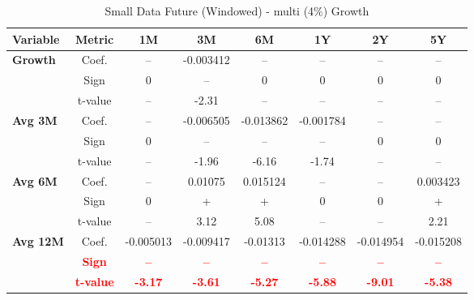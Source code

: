 \documentclass[11pt,english,a4paper,hidelinks]{book}
\begin{document}
\begin{table}[H]
    \centering
    \caption{Small Data Future (Windowed) - \acrshort{multi} (4\%) Growth}
    \begin{tabular}{lccccccc}
        \toprule
        \textbf{Variable} & \textbf{Metric} & \textbf{1M} & \textbf{3M} & \textbf{6M} & \textbf{1Y} & \textbf{2Y} & \textbf{5Y} \\
        \midrule
        \multirow{3}{*}{\textbf{Growth}}
            & Coef.   & --        & -0.003412 & --        & --        & --        & --        \\
            & Sign    & 0         & –         & 0         & 0         & 0         & 0         \\
            & t-value & --        & -2.31     & --        & --        & --        & --        \\
        \cmidrule{1-8}
        \multirow{3}{*}{\textbf{Avg 3M}}
            & Coef.   & --        & -0.006505 & -0.013862 & -0.001784 & --        & --        \\
            & Sign    & 0         & –         & –         & –         & 0         & 0         \\
            & t-value & --        & -1.96     & -6.16     & -1.74     & --        & --        \\
        \cmidrule{1-8}
        \multirow{3}{*}{\textbf{Avg 6M}}
            & Coef.   & --        & 0.01075   & 0.015124  & --        & --        & 0.003423  \\
            & Sign    & 0         & +         & +         & 0         & 0         & +         \\
            & t-value & --        & 3.12      & 5.08      & --        & --        & 2.21      \\
        \cmidrule{1-8}
        \multirow{3}{*}{\textbf{Avg 12M}}
            & Coef.   & -0.005013 & -0.009417 & -0.01313  & -0.014288 & -0.014954 & -0.015208 \\
            & \textbf{\textcolor{red}{Sign}}    & \textbf{\textcolor{red}{–}}         & \textbf{\textcolor{red}{–}}         & \textbf{\textcolor{red}{–}}         & \textbf{\textcolor{red}{–}}         & \textbf{\textcolor{red}{–}}         & \textbf{\textcolor{red}{–}}         \\
            & \textbf{\textcolor{red}{t-value}} & \textbf{\textcolor{red}{-3.17}}     & \textbf{\textcolor{red}{-3.61}}     & \textbf{\textcolor{red}{-5.27}}     & \textbf{\textcolor{red}{-5.88}}     & \textbf{\textcolor{red}{-9.01}}     & \textbf{\textcolor{red}{-5.38}}     \\

\end{tabular}
\end{table}
\end{document}
